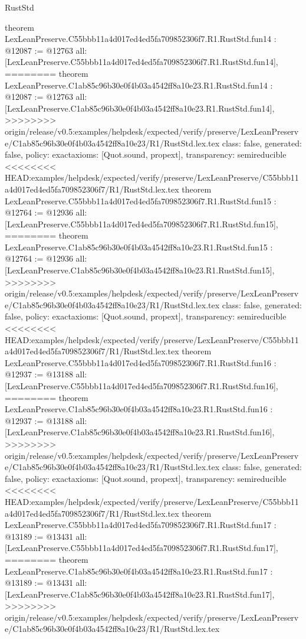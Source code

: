 \begin{lexlean}{RustStd}
\begin{coremodule}
{\begin{coremodule}
{{{{{{{{{{{{{{{{theorem LexLeanPreserve.C55bbb11a4d017ed4ed5fa709852306f7.R1.RustStd.fun14 : @12087 := @12763 {
  all: [LexLeanPreserve.C55bbb11a4d017ed4ed5fa709852306f7.R1.RustStd.fun14],
========
theorem LexLeanPreserve.C1ab85c96b30e0f4b03a4542ff8a10e23.R1.RustStd.fun14 : @12087 := @12763 {
  all: [LexLeanPreserve.C1ab85c96b30e0f4b03a4542ff8a10e23.R1.RustStd.fun14],
>>>>>>>> origin/release/v0.5:examples/helpdesk/expected/verify/preserve/LexLeanPreserve/C1ab85c96b30e0f4b03a4542ff8a10e23/R1/RustStd.lex.tex
  class: false,
  generated: false,
  policy: exact{axioms: [Quot.sound, propext]},
  transparency: semireducible
}
<<<<<<<< HEAD:examples/helpdesk/expected/verify/preserve/LexLeanPreserve/C55bbb11a4d017ed4ed5fa709852306f7/R1/RustStd.lex.tex
theorem LexLeanPreserve.C55bbb11a4d017ed4ed5fa709852306f7.R1.RustStd.fun15 : @12764 := @12936 {
  all: [LexLeanPreserve.C55bbb11a4d017ed4ed5fa709852306f7.R1.RustStd.fun15],
========
theorem LexLeanPreserve.C1ab85c96b30e0f4b03a4542ff8a10e23.R1.RustStd.fun15 : @12764 := @12936 {
  all: [LexLeanPreserve.C1ab85c96b30e0f4b03a4542ff8a10e23.R1.RustStd.fun15],
>>>>>>>> origin/release/v0.5:examples/helpdesk/expected/verify/preserve/LexLeanPreserve/C1ab85c96b30e0f4b03a4542ff8a10e23/R1/RustStd.lex.tex
  class: false,
  generated: false,
  policy: exact{axioms: [Quot.sound, propext]},
  transparency: semireducible
}
<<<<<<<< HEAD:examples/helpdesk/expected/verify/preserve/LexLeanPreserve/C55bbb11a4d017ed4ed5fa709852306f7/R1/RustStd.lex.tex
theorem LexLeanPreserve.C55bbb11a4d017ed4ed5fa709852306f7.R1.RustStd.fun16 : @12937 := @13188 {
  all: [LexLeanPreserve.C55bbb11a4d017ed4ed5fa709852306f7.R1.RustStd.fun16],
========
theorem LexLeanPreserve.C1ab85c96b30e0f4b03a4542ff8a10e23.R1.RustStd.fun16 : @12937 := @13188 {
  all: [LexLeanPreserve.C1ab85c96b30e0f4b03a4542ff8a10e23.R1.RustStd.fun16],
>>>>>>>> origin/release/v0.5:examples/helpdesk/expected/verify/preserve/LexLeanPreserve/C1ab85c96b30e0f4b03a4542ff8a10e23/R1/RustStd.lex.tex
  class: false,
  generated: false,
  policy: exact{axioms: [Quot.sound, propext]},
  transparency: semireducible
}
<<<<<<<< HEAD:examples/helpdesk/expected/verify/preserve/LexLeanPreserve/C55bbb11a4d017ed4ed5fa709852306f7/R1/RustStd.lex.tex
theorem LexLeanPreserve.C55bbb11a4d017ed4ed5fa709852306f7.R1.RustStd.fun17 : @13189 := @13431 {
  all: [LexLeanPreserve.C55bbb11a4d017ed4ed5fa709852306f7.R1.RustStd.fun17],
========
theorem LexLeanPreserve.C1ab85c96b30e0f4b03a4542ff8a10e23.R1.RustStd.fun17 : @13189 := @13431 {
  all: [LexLeanPreserve.C1ab85c96b30e0f4b03a4542ff8a10e23.R1.RustStd.fun17],
>>>>>>>> origin/release/v0.5:examples/helpdesk/expected/verify/preserve/LexLeanPreserve/C1ab85c96b30e0f4b03a4542ff8a10e23/R1/RustStd.lex.tex
}}}}}}}}}}}}}}}}}}}}}
\end{coremodule}}
\end{coremodule}
\end{lexlean}
